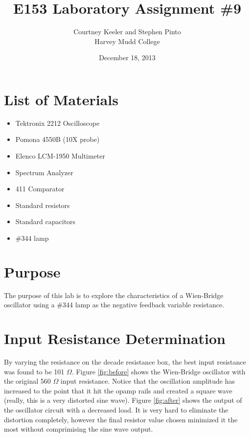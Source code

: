 \documentclass[12pt,letterpaper]{report}
\begin{document}
\title{E153 Laboratory Assignment \#9}
\author{Courtney Keeler and Stephen Pinto\\
Harvey Mudd College}
\date{December 18, 2013}
\maketitle

\section*{List of Materials}
\begin{itemize}
	\item Tektronix 2212 Oscilloscope
	\item Pomona 4550B (10X probe)
	\item Elenco LCM-1950 Multimeter
	\item Spectrum Analyzer
	\item 411 Comparator
	\item Standard resistors
	\item Standard capacitors
	\item \#344 lamp
\end{itemize}

\section*{Purpose}
The purpose of this lab is to explore the characteristics of a Wien-Bridge oscillator using a \#344 lamp as the negative feedback variable resistance.

\section*{Input Resistance Determination}

By varying the resistance on the decade resistance box, the best input resistance was found to be 101 $\Omega$. Figure \ref{fig:before} shows the Wien-Bridge oscillator with the original 560 $\Omega$ input resistance. Notice that the oscillation amplitude has increased to the point that it hit the opamp rails and created a square wave (really, this is a very distorted sine wave). Figure \ref{fig:after} shows the output of the oscillator circuit with a decreased load. It is very hard to eliminate the distortion completely, however the final resistor value chosen minimized it the most without comprimising the sine wave output.
\end{document}
